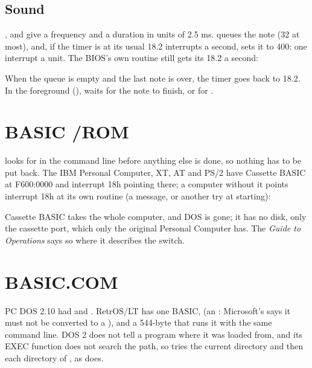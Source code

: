 
\subsection{Sound} ,  and  give
 a frequency and a duration in units of 2.5 ms.
 queues the note (32 at most), and, if the timer is at its
usual 18.2 interrupts a second, sets it to 400: one interrupt a unit. The
BIOS's own routine still gets its 18.2 a second:


When the queue is empty and the last note is over, the timer goes back to
18.2. In the foreground (),  waits for the note
to finish, or for .

\section{BASIC /ROM}

 looks for  in the command line before
anything else is done, so nothing has to be put back. The IBM Personal
Computer, XT, AT and PS/2 have Cassette BASIC at F600:0000 and
interrupt 18h pointing there; a computer without it points interrupt 18h
at its own routine (a message, or another try at starting):



Cassette BASIC takes the whole computer, and DOS is gone; it has no
disk, only the cassette port, which only the original Personal Computer
has. The \textit{Guide to Operations} says so where it describes the
switch.

\section{BASIC.COM}

PC DOS 2.10 had  and . RetrOS/LT has one
BASIC,  (an : Microsoft's 
says it must not be converted to a ), and a 544-byte
 that runs it with the same command line. DOS 2 does not
tell a program where it was loaded from, and its EXEC function does not
search the path, so  tries the current directory and
then each directory of , as  does.

